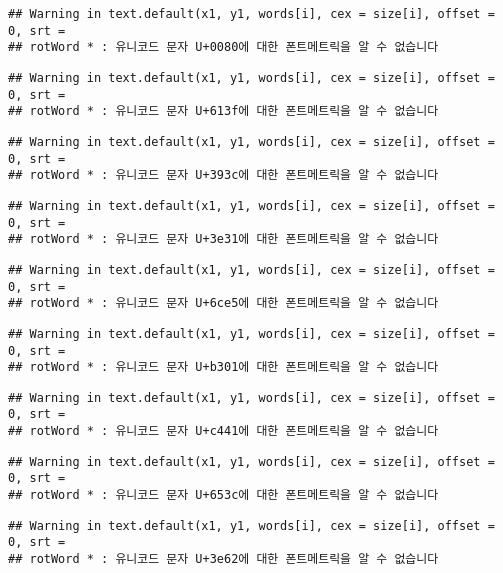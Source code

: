 \documentclass[]{article}
\begin{document}
\begin{verbatim}
## Warning in text.default(x1, y1, words[i], cex = size[i], offset = 0, srt =
## rotWord * : 유니코드 문자 U+0080에 대한 폰트메트릭을 알 수 없습니다
\end{verbatim}

\begin{verbatim}
## Warning in text.default(x1, y1, words[i], cex = size[i], offset = 0, srt =
## rotWord * : 유니코드 문자 U+613f에 대한 폰트메트릭을 알 수 없습니다
\end{verbatim}

\begin{verbatim}
## Warning in text.default(x1, y1, words[i], cex = size[i], offset = 0, srt =
## rotWord * : 유니코드 문자 U+393c에 대한 폰트메트릭을 알 수 없습니다
\end{verbatim}

\begin{verbatim}
## Warning in text.default(x1, y1, words[i], cex = size[i], offset = 0, srt =
## rotWord * : 유니코드 문자 U+3e31에 대한 폰트메트릭을 알 수 없습니다
\end{verbatim}

\begin{verbatim}
## Warning in text.default(x1, y1, words[i], cex = size[i], offset = 0, srt =
## rotWord * : 유니코드 문자 U+6ce5에 대한 폰트메트릭을 알 수 없습니다
\end{verbatim}

\begin{verbatim}
## Warning in text.default(x1, y1, words[i], cex = size[i], offset = 0, srt =
## rotWord * : 유니코드 문자 U+b301에 대한 폰트메트릭을 알 수 없습니다
\end{verbatim}

\begin{verbatim}
## Warning in text.default(x1, y1, words[i], cex = size[i], offset = 0, srt =
## rotWord * : 유니코드 문자 U+c441에 대한 폰트메트릭을 알 수 없습니다
\end{verbatim}

\begin{verbatim}
## Warning in text.default(x1, y1, words[i], cex = size[i], offset = 0, srt =
## rotWord * : 유니코드 문자 U+653c에 대한 폰트메트릭을 알 수 없습니다
\end{verbatim}

\begin{verbatim}
## Warning in text.default(x1, y1, words[i], cex = size[i], offset = 0, srt =
## rotWord * : 유니코드 문자 U+3e62에 대한 폰트메트릭을 알 수 없습니다
\end{verbatim}
\end{document}
